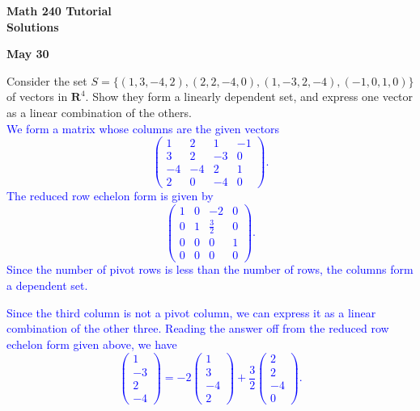 \documentclass[a4paper,11pt]{article}
\newcommand{\R}{\mathbf{R}}
\newcommand{\BB}[1]{\textcolor{blue}{#1}}
\begin{document}
\begin{center}
  {\Large\bfseries Math 240 Tutorial \\ Solutions}
\end{center}
\begin{center}
  {\bfseries May 30}
\end{center}

 Consider the set
$S=\{(1,3,-4,2),(2,2,-4,0),(1,-3,2,-4),(-1,0,1,0)\}$ of vectors in $\R^4$. Show
they form a linearly dependent set, and express one vector as a linear combination
of the others. \\

\BB{We form a matrix whose columns are the given vectors
  \[
    \left(
      \begin{array}{rrrr}
        1 & 2 & 1 & -1 \\
        3 & 2 & -3 & 0 \\
        -4 & -4 & 2 & 1 \\
        2 & 0 & -4 & 0
      \end{array}
    \right).
  \]
  The reduced row echelon form is given by
  \[
    \left(
      \begin{array}{rrrr}
        1 & 0 & -2 & 0 \\
        0 & 1 & \frac{3}{2} & 0 \\
        0 & 0 & 0 & 1 \\
        0 & 0 & 0 & 0
      \end{array}
    \right).
  \]
  Since the number of pivot rows is less than the number of rows, the columns
  form a dependent set.}

\BB{Since the third column is not a pivot column, we can express it as a linear
  combination of the other three. Reading the answer off from the reduced row
  echelon form given above, we have
  \[
    \left( \begin{array}{r}1\\-3\\2\\-4\end{array} \right)
    =-2\left( \begin{array}{r}1\\3\\-4\\2\end{array} \right)
    +\frac{3}{2}\left( \begin{array}{r}2\\2\\-4\\0\end{array} \right).
  \] \\
}
\end{document}
